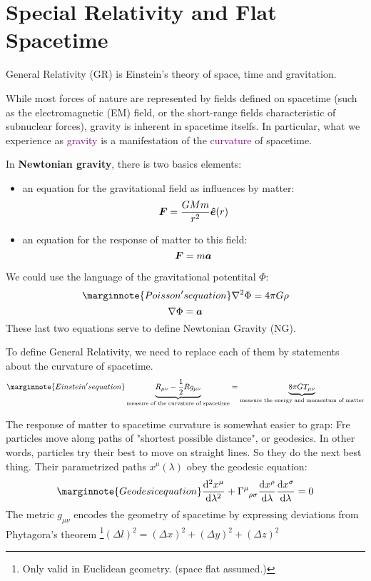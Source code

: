 \section{Special Relativity and Flat Spacetime}\label{sec:1}
General Relativity (GR) is Einstein's theory of space, time and gravitation.

While most forces of nature are represented by fields defined on spacetime (such as the electromagnetic (EM) field, or the short-range fields characteristic of subnuclear forces), gravity is inherent in spacetime itselfs. In particular, what we experience as \textcolor{purple}{gravity} is a manifestation of the \textcolor{purple}{curvature} of spacetime.

In \textbf{Newtonian gravity}, there is two basics elements:
\begin{itemize}
    \item an equation for the gravitational field as influences by matter:
    \begin{equation*}
        \vb*{F}=\frac{GMm}{r^2}\vu*{e}(r)
    \end{equation*}
    \item an equation for the response of matter to this field:
    \begin{equation}
        \vb*{F}=m\vb*{a}
    \end{equation}
\end{itemize}
We could use the language of the gravitational potentital $\Phi$:
\begin{equation}\marginnote{Poisson's equation}
    \nabla^2\Phi=4\pi G\rho
\end{equation}
\begin{equation}
    \nabla\Phi=\vb*{a}
\end{equation}
These last two equations serve to define Newtonian Gravity (NG).

To define General Relativity, we need to replace each of them by statements about the curvature of spacetime.
\begin{equation}\marginnote{Einstein's equation}
    \underbrace{R_{\mu\nu}-\frac{1}{2}Rg_{\mu\nu}}_{\text{measure of the curvature of spacetime}}= \underbrace{8\pi GT_{\mu\nu}}_{\text{measure the energy and momentum of matter}}
\end{equation}

The response of matter to spacetime curvature is somewhat easier to grap: Fre particles move along paths of "shortest possible distance", or geodesics. In other words, particles try their best to move on straight lines. So they do the next best thing. Their parametrized paths $x^\mu(\lambda)$ obey the geodesic equation:
\begin{equation}\marginnote{Geodesic equation}
    \dv[2]{x^\mu}{\lambda}+\tensor{\Gamma}{^\mu_{\rho\sigma}}\dv{x^\rho}{\lambda}\dv{x^\sigma}{\lambda}=0
\end{equation}
The metric $g_{\mu\nu}$ encodes the geometry of spacetime by expressing deviations from Phytagora's theorem \footnote{Only valid in Euclidean geometry. (space flat assumed.)}$(\Delta l)^2=(\Delta x)^2+(\Delta y)^2+(\Delta z)^2$

